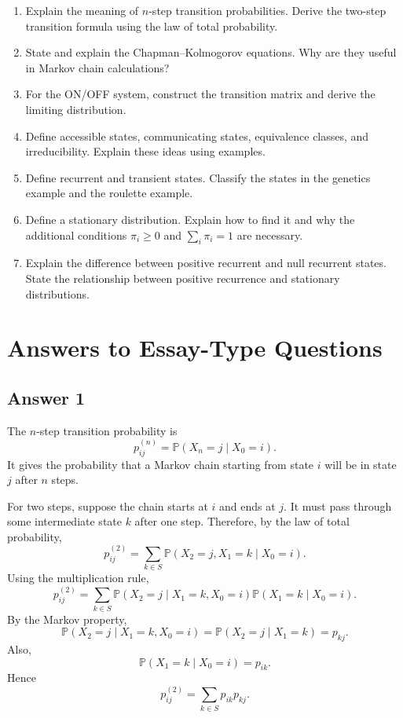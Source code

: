 \documentclass[12pt,a4paper]{article}
\theoremstyle{lecturestyle}
\newcommand{\Prob}{\mathbb{P}}
\begin{document}
\begin{enumerate}[label=\textbf{Q\arabic*.}, leftmargin=1.2cm]
    \item Explain the meaning of $n$-step transition probabilities. Derive the two-step transition formula using the law of total probability.
    \item State and explain the Chapman--Kolmogorov equations. Why are they useful in Markov chain calculations?
    \item For the ON/OFF system, construct the transition matrix and derive the limiting distribution.
    \item Define accessible states, communicating states, equivalence classes, and irreducibility. Explain these ideas using examples.
    \item Define recurrent and transient states. Classify the states in the genetics example and the roulette example.
    \item Define a stationary distribution. Explain how to find it and why the additional conditions $\pi_i\geq0$ and $\sum_i\pi_i=1$ are necessary.
    \item Explain the difference between positive recurrent and null recurrent states. State the relationship between positive recurrence and stationary distributions.
\end{enumerate}

\section{Answers to Essay-Type Questions}

\subsection*{Answer 1}

The $n$-step transition probability is
\[
p_{ij}^{(n)}=\Prob(X_n=j\mid X_0=i).
\]
It gives the probability that a Markov chain starting from state $i$ will be in state $j$ after $n$ steps.

For two steps, suppose the chain starts at $i$ and ends at $j$. It must pass through some intermediate state $k$ after one step. Therefore, by the law of total probability,
\[
p_{ij}^{(2)}
=
\sum_{k\in S}\Prob(X_2=j,X_1=k\mid X_0=i).
\]
Using the multiplication rule,
\[
p_{ij}^{(2)}
=
\sum_{k\in S}
\Prob(X_2=j\mid X_1=k,X_0=i)\Prob(X_1=k\mid X_0=i).
\]
By the Markov property,
\[
\Prob(X_2=j\mid X_1=k,X_0=i)
=
\Prob(X_2=j\mid X_1=k)
=p_{kj}.
\]
Also,
\[
\Prob(X_1=k\mid X_0=i)=p_{ik}.
\]
Hence
\[
p_{ij}^{(2)}=\sum_{k\in S}p_{ik}p_{kj}.
\]
\end{document}
